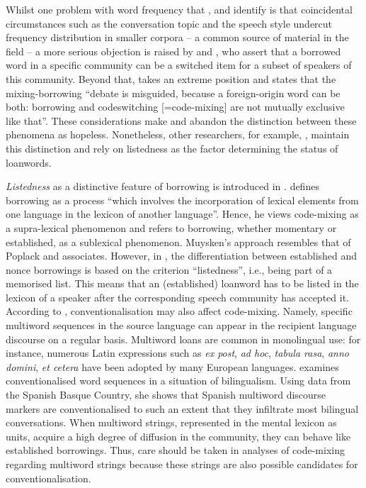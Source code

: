 Whilst one problem with word frequency that \citet[49]{haust-codeswitching-1995}, \citet[57]{boumans-syntax-1998} and \citet[46]{muhamedowa-untersuchung-2006} identify is that coincidental circumstances such as the conversation topic and the speech style undercut frequency distribution in smaller corpora -- a common source of material in the field -- a more serious objection is raised by \citet[57]{boumans-syntax-1998} and \citet{backus-13}, who assert that a borrowed word in a specific community can be a switched item for a subset of speakers of this community. Beyond that, \citet[][29]{backus-13} takes an extreme position and states that the mixing-borrowing ``debate is misguided, because a foreign-origin word can be both: borrowing and codeswitching [=code-mixing] are not mutually exclusive like that''. These considerations make \citet[96--97]{backus-two-1996} and \citet[58--60]{boumans-syntax-1998} abandon the distinction between these phenomena as hopeless. Nonetheless, other researchers, for example,  \citet[][]{muhamedowa-untersuchung-2006}, maintain this distinction and rely on listedness as the factor determining the status of loanwords.

\begin{sloppypar}
\textit{Listedness} as a distinctive feature of borrowing is introduced in \citet{milroy-code-switching-1995}. \citet[][189]{milroy-code-switching-1995} defines borrowing as a process ``which involves the incorporation of lexical elements from one language in the lexicon of another language''. Hence, he views code-mixing as a supra-lexical phenomenon and refers to borrowing, whether momentary or established, as a sublexical phenomenon. Muysken's approach resembles that of Poplack and associates. However, in \citet{milroy-code-switching-1995, muysken-bilingual-2000}, the differentiation between established and nonce borrowings is based on the criterion ``listedness'', i.e., being part of a memorised list. This means that an (established) loanword has to be listed in the lexicon of a speaker after the corresponding speech community has accepted it. According to \citet{milroy-code-switching-1995, muysken-bilingual-2000}, conventionalisation may also affect code-mixing. Namely, specific multiword sequences in the source language can appear in the recipient language discourse on a regular basis. Multiword loans are common in monolingual use: for instance, numerous Latin expressions such as \textit{ex post}, \textit{ad hoc}, \textit{tabula rasa}, \textit{anno domini}, \textit{et cetera} have been adopted by many European languages. \citet{lantto2015} examines conventionalised word sequences in a situation of bilingualism. Using data from the Spanish Basque Country, she shows that Spanish multiword discourse markers are conventionalised to such an extent that they infiltrate most bilingual conversations. When multiword strings, represented in the mental lexicon as units, acquire a high degree of diffusion in the community, they can behave like established borrowings. Thus, care should be taken in analyses of code-mixing regarding multiword strings because these strings are also possible candidates for conventionalisation.
\end{sloppypar}

